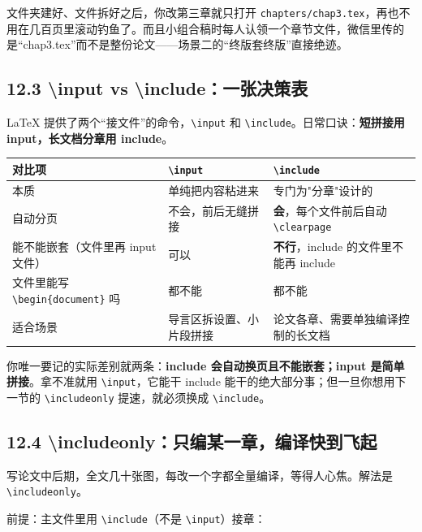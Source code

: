 文件夹建好、文件拆好之后，你改第三章就只打开 \texttt{chapters/chap3.tex}，再也不用在几百页里滚动钓鱼了。而且小组合稿时每人认领一个章节文件，微信里传的是“chap3.tex”而不是整份论文——场景二的“终版套终版”直接绝迹。

\subsection*{12.3 \textbackslash{}input vs \textbackslash{}include：一张决策表}

LaTeX 提供了两个“接文件”的命令，\texttt{\textbackslash{}input} 和 \texttt{\textbackslash{}include}。日常口诀：\textbf{短拼接用 input，长文档分章用 include}。

\begin{table}[htbp]
\centering
\small
\begin{tabularx}{\linewidth}{@{}*{3}{>{\raggedright\arraybackslash}X}@{}}
\toprule
\textbf{对比项} & \textbf{\texttt{\textbackslash{}input}} & \textbf{\texttt{\textbackslash{}include}} \\
\midrule
本质 & 单纯把内容粘进来 & 专门为"分章"设计的 \\
自动分页 & 不会，前后无缝拼接 & \textbf{会}，每个文件前后自动 \texttt{\textbackslash{}clearpage} \\
能不能嵌套（文件里再 input 文件） & 可以 & \textbf{不行}，include 的文件里不能再 include \\
文件里能写 \texttt{\textbackslash{}begin\{document\}} 吗 & 都不能 & 都不能 \\
适合场景 & 导言区拆设置、小片段拼接 & 论文各章、需要单独编译控制的长文档 \\
\bottomrule
\end{tabularx}
\end{table}

你唯一要记的实际差别就两条：\textbf{include 会自动换页且不能嵌套；input 是简单拼接}。拿不准就用 \texttt{\textbackslash{}input}，它能干 include 能干的绝大部分事；但一旦你想用下一节的 \texttt{\textbackslash{}includeonly} 提速，就必须换成 \texttt{\textbackslash{}include}。

\subsection*{12.4 \textbackslash{}includeonly：只编某一章，编译快到飞起}

写论文中后期，全文几十张图，每改一个字都全量编译，等得人心焦。解法是 \texttt{\textbackslash{}includeonly}。

前提：主文件里用 \texttt{\textbackslash{}include}（不是 \texttt{\textbackslash{}input}）接章：


